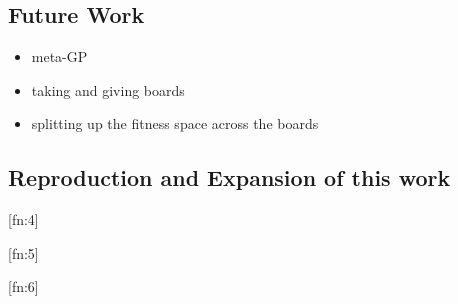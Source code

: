 \documentclass[11pt]{article}
\begin{document}
\subsection*{Future Work}
\label{sec-1.6}

\begin{itemize}
\item meta-GP
\item taking and giving boards
\item splitting up the fitness space across the boards
\end{itemize}

\subsection*{Reproduction and Expansion of this work}
\label{sec-1.7}
\label{reproduction}






[fn:4]

[fn:5]

[fn:6]   
\end{document}
